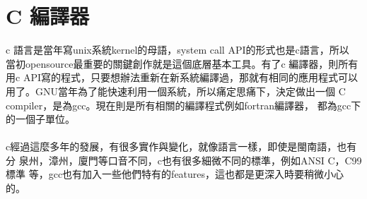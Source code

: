 \chapter{C 編譯器}
  c 語言是當年寫unix系統kernel的母語，system call API的形式也是c語言，所以
  當初opensource最重要的關鍵創作就是這個底層基本工具。有了c 編譯器，則所有
  用c API寫的程式，只要想辦法重新在新系統編譯過，那就有相同的應用程式可以
  用了。GNU當年為了能快速利用一個系統，所以痛定思痛下，決定做出一個 C
  compiler，是為gcc。現在則是所有相關的編譯程式例如fortran編譯器，
  都為gcc下的一個子單位。
  \\\\
  c經過這麼多年的發展，有很多實作與變化，就像語言一樣，即使是閩南語，也有分
  泉州，漳州，廈門等口音不同，c也有很多細微不同的標準，例如ANSI C，C99標準
  等，gcc也有加入一些他們特有的features，這也都是更深入時要稍微小心的。
